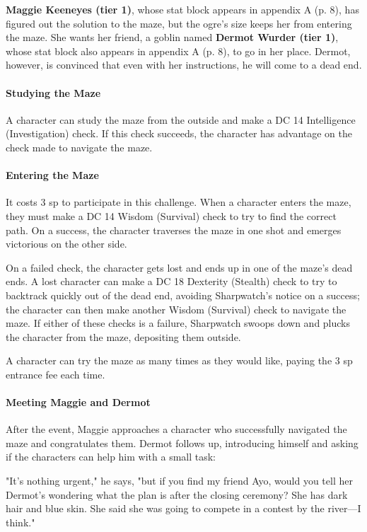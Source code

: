 \documentclass[a4paper, 11pt, bg=full, twocolumn, nooutline]{dndbook}
\begin{document}
\textbf{Maggie Keeneyes (tier 1)}, whose stat block appears in appendix A (p. 8), has figured out the solution to the maze, but the ogre's size keeps her from entering the maze. She wants her friend, a goblin named \textbf{Dermot Wurder (tier 1)}, whose stat block also appears in appendix A (p. 8), to go in her place. Dermot, however, is convinced that even with her instructions, he will come to a dead end.

\paragraph{Studying the Maze}

A character can study the maze from the outside and make a DC 14 Intelligence (Investigation) check. If this check succeeds, the character has advantage on the check made to navigate the maze.

\paragraph{Entering the Maze}

It costs 3 sp to participate in this challenge. When a character enters the maze, they must make a DC 14 Wisdom (Survival) check to try to find the correct path. On a success, the character traverses the maze in one shot and emerges victorious on the other side.

On a failed check, the character gets lost and ends up in one of the maze's dead ends. A lost character can make a DC 18 Dexterity (Stealth) check to try to backtrack quickly out of the dead end, avoiding Sharpwatch's notice on a success; the character can then make another Wisdom (Survival) check to navigate the maze. If either of these checks is a failure, Sharpwatch swoops down and plucks the character from the maze, depositing them outside.

A character can try the maze as many times as they would like, paying the 3 sp entrance fee each time.

\paragraph{Meeting Maggie and Dermot}

After the event, Maggie approaches a character who successfully navigated the maze and congratulates them. Dermot follows up, introducing himself and asking if the characters can help him with a small task:

\begin{DndReadAloud}
"It's nothing urgent," he says, "but if you find my friend Ayo, would you tell her Dermot's wondering what the plan is after the closing ceremony? She has dark hair and blue skin. She said she was going to compete in a contest by the river---I think."
\end{DndReadAloud}
\end{document}
